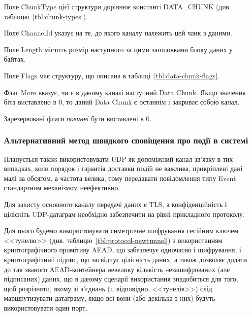 Поле ChunkType цієї структури дорівнює константі DATA\_CHUNK
(див. таблицю~\ref{tbl:chunk-types}).

Поле ChannelId указує на те, до якого каналу належить цей чанк з даними.

Поле Length містить розмір наступного за цими заголовками блоку даних у байтах.

Поле Flags має структуру, що описана в таблиці~\ref{tbl:data-chunk-flags}.

\begin{table}[htbp]
\end{table}

Флаг More вказує, чи є в даному каналі наступний Data Chunk. Якщо значення біта
виставлено в 0, то даний Data Chunk є останнім і закриває собою канал.

Зарезервовані флаги \emph{повинні} бути виставлені в 0.

\subsubsection{Альтернативний метод швидкого сповіщення про події в системі}

Планується також використовувати UDP як допоміжний канал зв'язку в тих
випадках, коли порядок і гарантія доставки подій не важлива, прикріплені дані
малі за обсягом, а частота велика, тому передавати повідомлення типу Event
стандартним механізмом неефективно.

Для захисту основного каналу передачі даних є TLS, а конфіденційність і
цілісніть UDP-датаграм необхідно забезпечити на рівні прикладного протоколу.

Для цього будемо використовувати симетричне шифрування сесійним ключем
<<тунелю>> (див. таблицю~\ref{tbl:protocol-newtunnel}) з використанням
криптографічного примітиву \gls{AEAD}, що забезпечує одночасно і шифрування, і
криптографічний підпис, що засвідчує цілісність даних, а також дозволяє додати
до так званого \gls{AEAD}-контейнера невелику кількість незашифрованих (але
підписаних) даних, що в даному сценарії використання знадобиться для того, щоб
розрізняти, якому зі з'єднань (і, відповідно, <<тунелів>>) слід маршрутизувати
датаграму, якщо всі вони (або декілька з них) будуть використовувати один порт.

